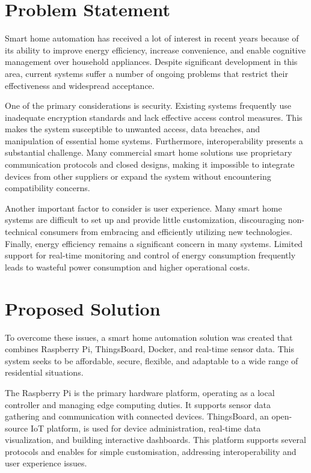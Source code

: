 \documentclass[a4paper,12pt]{report}
\begin{document}
\section{Problem Statement}

Smart home automation has received a lot of interest in recent years because of its ability to improve energy efficiency, increase convenience, and enable cognitive management over household appliances.  Despite significant development in this area, current systems suffer a number of ongoing problems that restrict their effectiveness and widespread acceptance.

One of the primary considerations is security.  Existing systems frequently use inadequate encryption standards and lack effective access control measures.  This makes the system susceptible to unwanted access, data breaches, and manipulation of essential home systems.  Furthermore, interoperability presents a substantial challenge.  Many commercial smart home solutions use proprietary communication protocols and closed designs, making it impossible to integrate devices from other suppliers or expand the system without encountering compatibility concerns.

Another important factor to consider is user experience.  Many smart home systems are difficult to set up and provide little customization, discouraging non-technical consumers from embracing and efficiently utilizing new technologies.  Finally, energy efficiency remains a significant concern in many systems.  Limited support for real-time monitoring and control of energy consumption frequently leads to wasteful power consumption and higher operational costs.

\section{Proposed Solution}

To overcome these issues, a smart home automation solution was created that combines Raspberry Pi, ThingsBoard, Docker, and real-time sensor data.  This system seeks to be affordable, secure, flexible, and adaptable to a wide range of residential situations.

The Raspberry Pi is the primary hardware platform, operating as a local controller and managing edge computing duties.  It supports sensor data gathering and communication with connected devices.  ThingsBoard, an open-source IoT platform, is used for device administration, real-time data visualization, and building interactive dashboards.  This platform supports several protocols and enables for simple customisation, addressing interoperability and user experience issues.
\end{document}
